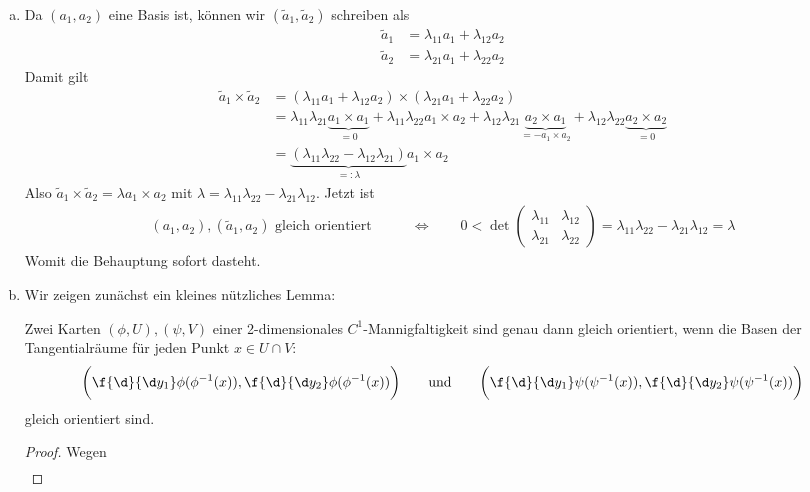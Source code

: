 \documentclass[a4paper]{scrartcl}
\begin{document}
\setcounter{section}{13}

\begin{aufgabe}
	\begin{enumerate}[(a)]
		\item
			Da $(a_1,a_2)$ eine Basis ist, können wir $(\tilde a_1, \tilde a_2)$ schreiben als
			\begin{align*}
				\tilde a_1 &= \lambda_{11} a_1 + \lambda_{12} a_2 \\
				\tilde a_2 &= \lambda_{21} a_1 + \lambda_{22} a_2
			\end{align*}
			Damit gilt
			\begin{align*}
				\tilde a_1 \times \tilde a_2
				&= (\lambda_{11}a_1 + \lambda_{12}a_2) \times (\lambda_{21}a_1 + \lambda_{22}a_2) \\
				&= \lambda_{11}\lambda_{21}\underbrace{a_1\times a_1}_{=0} + \lambda_{11} \lambda_{22}a_1 \times a_2 + \lambda_{12}\lambda_{21} \underbrace{a_2 \times a_1}_{= - a_1\times a_2}+ \lambda_{12}\lambda_{22} \underbrace{a_2\times a_2}_{=0} \\
				&= \underbrace{(\lambda_{11}\lambda_{22} - \lambda_{12}\lambda_{21})}_{=:\lambda}a_1\times a_2
			\end{align*}
			Also $\tilde a_1 \times \tilde a_2 = \lambda a_1 \times a_2$ mit $\lambda = \lambda_{11}\lambda_{22} - \lambda_{21} \lambda_{12}$.
			Jetzt ist
			\begin{align*}
				(a_1,a_2), (\tilde a_1,a_2) \text{ gleich orientiert}
				\qquad&\iff\qquad 0 < \det \begin{pmatrix}
					\lambda_{11} & \lambda_{12} \\
					\lambda_{21} & \lambda_{22}
				\end{pmatrix} = \lambda_{11}\lambda_{22} - \lambda_{21}\lambda_{12} = \lambda
			\end{align*}
			Womit die Behauptung sofort dasteht.
		\item
			Wir zeigen zunächst ein kleines nützliches Lemma:
			\begin{lem*}
				Zwei Karten $(\phi, U), (\psi, V)$ einer 2-dimensionales $C^1$-Mannigfaltigkeit sind genau dann gleich orientiert, wenn die Basen der Tangentialräume für jeden Punkt $x \in U\cap V$:
				\[
					\bigg( \f{\d}{\d y_1} \phi(\phi^{-1}(x)), \f{\d}{\d y_2} \phi(\phi^{-1}(x)) \bigg)
					\qquad \text{und}\qquad
					\bigg( \f{\d}{\d y_1} \psi(\psi^{-1}(x)), \f{\d}{\d y_2} \psi(\psi^{-1}(x)) \bigg)
				\]
				gleich orientiert sind.
				\begin{proof}
					Wegen
					\begin{align*}

\end{align*}
\end{proof}
\end{lem*}
\end{enumerate}
\end{aufgabe}
\end{document}
